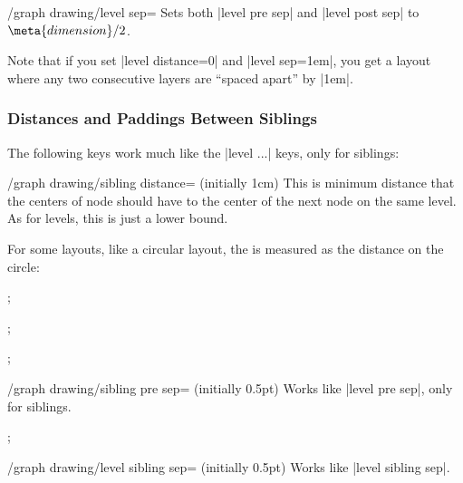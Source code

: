 \begin{key}{/graph drawing/level sep=}
  Sets both |level pre sep| and |level post sep| to
  $\meta{dimension}/2$.
\end{key}

Note that if you set |level distance=0| and |level sep=1em|, you get
a layout where any two consecutive layers are ``spaced apart'' by
|1em|.


\subsubsection{Distances and Paddings Between Siblings}

The following keys work much like the |level ...| keys, only for
siblings:

\begin{key}{/graph drawing/sibling distance= (initially 1cm)}
  This is minimum distance that the centers of node should have to the
  center of the next node on the same level. As for levels, this is
  just a lower bound.

  For some layouts, like a circular layout, the  is
  measured as the distance on the circle:
\begin{codeexample}[]
\tikz {};  
\end{codeexample}
\begin{codeexample}[]
\tikz {};  
\end{codeexample}
\begin{codeexample}[]
\tikz {};  
\end{codeexample}
\end{key}


\begin{key}{/graph drawing/sibling pre sep= (initially 0.5pt)}
  Works like |level pre sep|, only for siblings.
\begin{codeexample}[]
\tikz {};  
\end{codeexample}
\end{key}
\begin{key}{/graph drawing/level sibling sep= (initially 0.5pt)}
  Works like |level sibling sep|.
\end{key}

